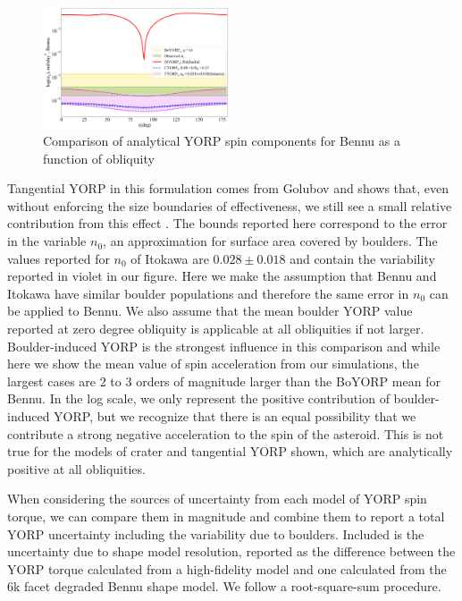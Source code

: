 \begin{figure}[H]
    \centering
    \includegraphics[width=0.49\textwidth]{fig/all_yorps.png}
    \caption{Comparison of analytical YORP spin components for Bennu as a function of obliquity}
    \label{fig:all_yorps}
\end{figure}
Tangential YORP in this formulation comes from Golubov and shows that, even without enforcing the size boundaries of effectiveness, we still see a small relative contribution from this effect \citep{Golubov2017}. The bounds reported here correspond to the error in the variable $n_0$, an approximation for surface area covered by boulders. The values reported for $n_0$ of Itokawa are $0.028\pm0.018$ and contain the variability reported in violet in our figure. Here we make the assumption that Bennu and Itokawa have similar boulder populations and therefore the same error in $n_0$ can be applied to Bennu. We also assume that the mean boulder YORP value reported at zero degree obliquity is applicable at all obliquities if not larger. Boulder-induced YORP is the strongest influence in this comparison and while here we show the mean value of spin acceleration from our simulations, the largest cases are 2 to 3 orders of magnitude larger than the BoYORP mean for Bennu. In the log scale, we only represent the positive contribution of boulder-induced YORP, but we recognize that there is an equal possibility that we contribute a strong negative acceleration to the spin of the asteroid. This is not true for the models of crater and tangential YORP shown, which are analytically positive at all obliquities. 


When considering the sources of uncertainty from each model of YORP spin torque, we can compare them in magnitude and combine them to report a total YORP uncertainty including the variability due to boulders. Included is the uncertainty due to shape model resolution, reported as the difference between the YORP torque calculated from a high-fidelity model and one calculated from the $~$6k facet degraded Bennu shape model. We follow a root-square-sum procedure. 

